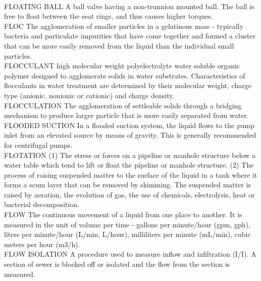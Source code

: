 \documentclass{article}
\begin{document}
\vspace{0.3cm}\\
FLOATING BALL
A ball valve having a non-trunnion mounted ball. The ball is free to float between the seat rings, and thus causes higher torques.
\vspace{0.3cm}\\
FLOC
The agglomeration of smaller particles in a gelatinous mass - typically bacteria and particulate impurities that have come together and formed a cluster that can be more easily removed from the liquid than the individual small particles.
\vspace{0.3cm}\\
FLOCCULANT
high molecular weight polyelectrolyte water soluble organic polymer designed to agglomerate solids in water substrates. Characteristics of flocculants in water treatment are determined by their molecular weight, charge type (anionic, nonionic or cationic) and charge density.
\vspace{0.3cm}\\
FLOCCULATION
The agglomeration of settleable solids through a bridging mechanism to produce larger particle that is more easily separated from water.
\vspace{0.3cm}\\
FLOODED SUCTION
In a flooded suction system, the liquid flows to the pump inlet from an elevated source by means of gravity. This is generally recommended for centrifugal pumps.
\vspace{0.3cm}\\
FLOTATION
(1) The stress or forces on a pipeline or manhole structure below a water table which tend to lift or float the pipeline or manhole structure. (2) The process of raising suspended matter to the surface of the liquid in a tank where it forms a scum layer that can be removed by skimming. The suspended matter is raised by aeration, the evolution of gas, the use of chemicals, electrolysis, heat or bacterial decomposition. 
\vspace{0.3cm}\\
FLOW
The continuous movement of a liquid from one place to another. It is measured in the unit of volume per time - gallons per minute/hour (gpm, gph), liters per minute/hour (L/min, L/hour), milliliters per minute (mL/min), cubic meters per hour (m3/h). 
\vspace{0.3cm}\\
FLOW ISOLATION
A procedure used to measure inflow and infiltration (I/I). A section of sewer is blocked off or isolated and the flow from the section is measured. 
\end{document}
